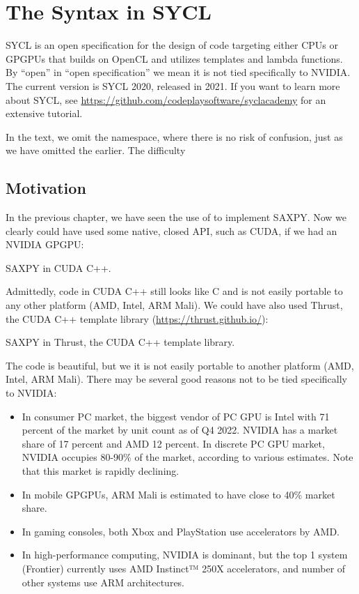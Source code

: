 \chapter{The Syntax in SYCL}

SYCL is an open specification for the design of code targeting either CPUs or GPGPUs 
that builds on OpenCL and utilizes templates and lambda functions.
By ``open'' in ``open specification'' we mean it is not tied specifically to NVIDIA. 
The current version is SYCL 2020, released in 2021. 
If you want to learn more about SYCL, see 
\url{https://github.com/codeplaysoftware/syclacademy} for an extensive tutorial.

In the text, we omit the  namespace, where there is no risk of confusion, just as we have omitted the  earlier. The difficulty 

\section{Motivation}

In the previous chapter, we have seen the use of  to implement SAXPY. Now we clearly could have used some native, closed API, such as CUDA, if we had an NVIDIA GPGPU:

\raggedbottom
\begin{codebox}[]{}
\footnotesize SAXPY in CUDA C++.
\tcblower
{}
\end{codebox}

Admittedly, code in CUDA C++ still looks like C and is not easily portable to any other platform (AMD, Intel, ARM Mali). We could have also used Thrust, the CUDA C++ template library (\url{https://thrust.github.io/}): 

\raggedbottom
\begin{codebox}[]{}
\footnotesize SAXPY in Thrust, the CUDA C++ template library.
\tcblower
{}
\end{codebox}

The code is beautiful, but we it is not easily portable to another platform (AMD, Intel, ARM Mali). There may be several good reasons not to be tied specifically to NVIDIA:
\begin{itemize}
\item In consumer PC market, the biggest vendor of PC GPU is Intel with 71 percent of the market by unit count as of Q4 2022. NVIDIA has a market share of 17 percent and AMD 12 percent. In discrete PC GPU market, NVIDIA occupies 80-90\% of the market, according to various estimates. 
Note that this market is rapidly declining.
\item In mobile GPGPUs, ARM Mali is estimated to have close to 40\% market share.  
\item In gaming consoles, both Xbox and PlayStation use accelerators by AMD. 
\item In high-performance computing, NVIDIA is dominant, but the top 1 system (Frontier) currently uses AMD Instinct™ 250X accelerators, and number of other systems use ARM architectures. 
\end{itemize}

